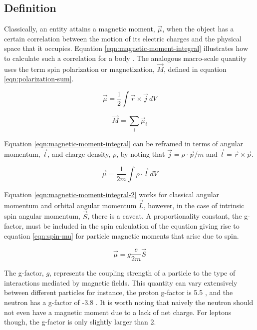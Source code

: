 \subsection{Definition}
Classically, an entity attains a magnetic moment, $\vec{\mu}$, when the object has a certain correlation between the motion of its electric charges and the physical space that it occupies.  Equation \ref{eqn:magnetic-moment-integral} illustrates how to calculate such a correlation for a body \cite{jackson}.  The analogous macro-scale quantity uses the term spin polarization or magnetization, $\vec{M}$, defined in equation \ref{eqn:polarization-sum}.

\begin{equation}
\label{eqn:magnetic-moment-integral}
\vec{\mu} = \frac{1}{2} \int \vec{r} \times \vec{j} \,dV
\end{equation}

\begin{equation}
\label{eqn:polarization-sum}
\vec{M} = \sum_i \vec{\mu}_i
\end{equation}

\noindent
Equation \ref{eqn:magnetic-moment-integral} can be reframed in terms of angular momentum, $\vec{l}$, and charge density, $\rho$, by noting that $\vec{j} = \rho \cdot \vec{p}/m$ and $\vec{l} = \vec{r} \times \vec{p}$.

\begin{equation}
\label{eqn:magnetic-moment-integral-2}
\vec{\mu} = \frac{1}{2 m} \int \rho \cdot \vec{l} \,dV
\end{equation}

Equation \ref{eqn:magnetic-moment-integral-2} works for classical angular momentum and orbital angular momentum $\vec{L}$, however, in the case of intrinsic spin angular momentum, $\vec{S}$, there is a caveat.  A proportionality constant, the g-factor, must be included in the spin calculation of the equation giving rise to equation \ref{eqn:spin-mu} for particle magnetic moments that arise due to spin.

\begin{equation}
\label{eqn:spin-mu}
\vec{\mu} = g \frac{e}{2 m}\vec{S}
\end{equation}

\noindent
The g-factor, $g$, represents the coupling strength of a particle to the type of interactions mediated by magnetic fields.  This quantity can vary extensively between different particles for instance, the proton g-factor is 5.5 \cite{codata}, and the neutron has a g-factor of -3.8 \cite{codata}.  It is worth noting that naively the neutron should not even have a magnetic moment due to a lack of net charge.  For leptons though, the g-factor is only slightly larger than 2.

